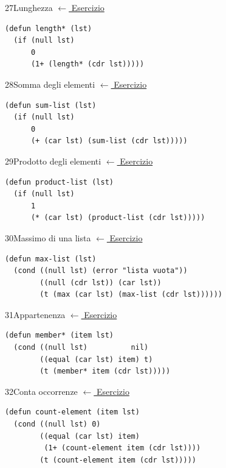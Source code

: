 \label{sol:27}
\begin{solbox}{27}{Lunghezza}
\small\color{black!55}\hyperref[ex:27]{$\leftarrow$ Esercizio}\normalsize\color{black}
\begin{lstlisting}
(defun length* (lst)
  (if (null lst)
      0
      (1+ (length* (cdr lst)))))
\end{lstlisting}
\end{solbox}

\label{sol:28}
\begin{solbox}{28}{Somma degli elementi}
\small\color{black!55}\hyperref[ex:28]{$\leftarrow$ Esercizio}\normalsize\color{black}
\begin{lstlisting}
(defun sum-list (lst)
  (if (null lst)
      0
      (+ (car lst) (sum-list (cdr lst)))))
\end{lstlisting}
\end{solbox}

\label{sol:29}
\begin{solbox}{29}{Prodotto degli elementi}
\small\color{black!55}\hyperref[ex:29]{$\leftarrow$ Esercizio}\normalsize\color{black}
\begin{lstlisting}
(defun product-list (lst)
  (if (null lst)
      1
      (* (car lst) (product-list (cdr lst)))))
\end{lstlisting}
\end{solbox}

\label{sol:30}
\begin{solbox}{30}{Massimo di una lista}
\small\color{black!55}\hyperref[ex:30]{$\leftarrow$ Esercizio}\normalsize\color{black}
\begin{lstlisting}
(defun max-list (lst)
  (cond ((null lst) (error "lista vuota"))
        ((null (cdr lst)) (car lst))
        (t (max (car lst) (max-list (cdr lst))))))
\end{lstlisting}
\end{solbox}

\label{sol:31}
\begin{solbox}{31}{Appartenenza}
\small\color{black!55}\hyperref[ex:31]{$\leftarrow$ Esercizio}\normalsize\color{black}
\begin{lstlisting}
(defun member* (item lst)
  (cond ((null lst)          nil)
        ((equal (car lst) item) t)
        (t (member* item (cdr lst)))))
\end{lstlisting}
\end{solbox}

\label{sol:32}
\begin{solbox}{32}{Conta occorrenze}
\small\color{black!55}\hyperref[ex:32]{$\leftarrow$ Esercizio}\normalsize\color{black}
\begin{lstlisting}
(defun count-element (item lst)
  (cond ((null lst) 0)
        ((equal (car lst) item)
         (1+ (count-element item (cdr lst))))
        (t (count-element item (cdr lst)))))
\end{lstlisting}
\end{solbox}

